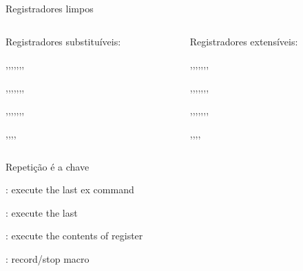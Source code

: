 \begin{frame}{Registradores limpos}
	\begin{columns}
        \begin{column}{0.5\textwidth}
            \begin{widedescription}
                \item Registradores substituíveis:

                \begin{description}
                    \item {},,,,,,,
                    \item {},,,,,,,
                    \item {},,,,,,,
                    \item {},,,,
				\end{description}
            \end{widedescription}
        \end{column}

        \begin{column}{0.5\textwidth}
            \begin{widedescription}
                \item Registradores extensíveis:

                \begin{description}
                    \item {},,,,,,,
                    \item {},,,,,,,
                    \item {},,,,,,,
                    \item {},,,,
				\end{description}
            \end{widedescription}
        \end{column}
	  \end{columns}
\end{frame}

\begin{frame}{Repetição é a chave}
    \begin{widedescription}
        \item {}: execute the last ex command
        \item {}: execute the last 
        \item {}: execute the contents of register
        \item {}: record/stop macro
    \end{widedescription}
\end{frame}

